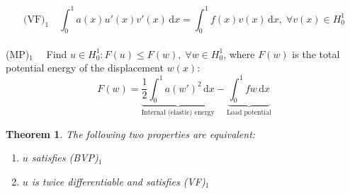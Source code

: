 \documentclass[12pt, a4paper]{article}
\newcommand{\rd}{\ensuremath{\mathrm{d}}}
\newcommand{\id}{\ensuremath{\,\rd}}
\newtheorem{theorem}{Theorem}[section]
\numberwithin{equation}{section}
\begin{document}
\begin{equation}
\label{vf}
\text{(VF)}_1 \quad \int_0^1 a(x)u'(x)v'(x)\id x = \int_0^1 f(x)v(x) \id x, \; \forall v(x)\in H_0^1
\end{equation}
\\
(MP)$_1 \quad$ Find $u\in H_0^1 : F(u) \leq F(w), \; \forall w\in H_0^1$, where $F(w)$ is the total potential energy of the displacement $w(x)$:
\begin{equation}
\label{mp}
F(w) = \underbrace{\frac{1}{2}\int_0^1 a(w')^2 \id x}_\text{Internal (elastic) energy} - \underbrace{\int_0^1 fw \id x}_\text{Load potential}
\end{equation}

\begin{theorem}
The following two properties are equivalent:
\begin{enumerate}[label={(\roman*)}]
    \item $u$ satisfies \textnormal{(BVP)}$_1$
    \item $u$ is twice differentiable and satisfies \textnormal{(VF)}$_1$
\end{enumerate}
\end{theorem}
\end{document}
